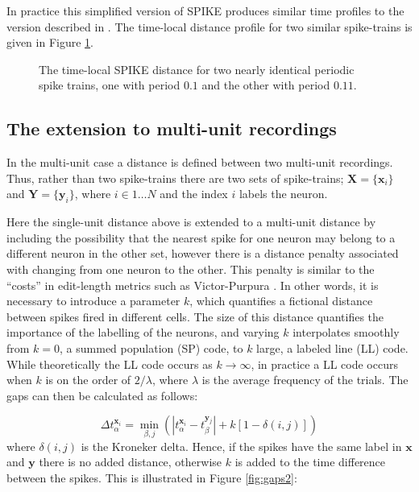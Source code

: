 \documentclass[12pt]{amsart}
\begin{document}
In practice this simplified version of SPIKE produces similar time profiles to the version described in \cite{Kreuzetal2007}.  The time-local distance profile for two similar spike-trains is given in Figure \ref{fig:periodspike}.

\begin{figure}[thb]
\begin{center}

\end{center}
\caption{The time-local SPIKE distance for two nearly identical periodic spike trains, one with period $0.1$ and the other with period $0.11$.\label{fig:periodspike}}
\end{figure}


\subsection{The extension to multi-unit recordings}

In the multi-unit case a distance is defined between two multi-unit recordings.  Thus, rather than two spike-trains there are two sets of spike-trains; $\mathbf{X}=\{ \mathbf{x}_i \}$ and $ \mathbf{Y}=\{ \mathbf{y}_i \}$, where $i \in 1\ldots N$ and the index $i$ labels the neuron.

Here the single-unit distance above is extended to a multi-unit distance by including the possibility that the nearest spike for one neuron may belong to a different neuron in the other set, however there is a distance penalty associated with changing from one neuron to the other. This penalty is similar to the ``costs'' in edit-length metrics such as Victor-Purpura \cite{VictorPurpura1997}. In other words, it is necessary to introduce a parameter $k$, which quantifies a fictional distance between spikes fired in different cells.  The size of this distance quantifies the importance of the labelling of the neurons, and varying $k$ interpolates smoothly from $k=0$, a summed population (SP) code, to $k$ large, a labeled line  (LL) code.  While theoretically the LL code occurs as $k \rightarrow \infty$, in practice a LL code occurs when $k$ is on the order of $2/\lambda$, where $\lambda$ is the average frequency of the trials.   The gaps can then be calculated as follows:

\begin{equation}
\Delta t_{\alpha}^{\mathbf{x}_i} = \min_{\beta,j} \left( |t_{\alpha}^{\mathbf{x}_i} - t_{\beta}^{\mathbf{y}_j} | + k\left[1-\delta(i,j)\right] \right)
\end{equation}
where $\delta(i,j)$ is the Kroneker delta. Hence, if the spikes have the same label in $\mathbf{x}$ and $\mathbf{y}$ there is no added distance, otherwise $k$ is added to the time difference between the spikes.  This is illustrated in Figure \ref{fig:gaps2}:
\end{document}

